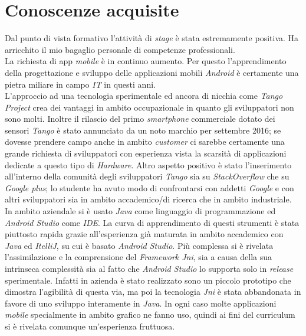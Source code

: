 \section{Conoscenze acquisite}
Dal punto di vista formativo l'attività di \emph{stage} è stata estremamente positiva. Ha arricchito il mio bagaglio personale di competenze professionali.\\

La richiesta di app \emph{mobile} è in continuo aumento. Per questo l'apprendimento della progettazione e sviluppo delle applicazioni mobili \emph{Android} è certamente una pietra miliare in campo \emph{IT} in questi anni.\\

L'approccio ad una tecnologia sperimentale ed ancora di nicchia come \emph{Tango Project} crea dei vantaggi in ambito occupazionale in quanto gli sviluppatori non sono molti. Inoltre il rilascio del primo \emph{smartphone} commerciale dotato dei sensori \emph{Tango} è stato annunciato da un noto marchio per settembre 2016; se dovesse prendere campo anche in ambito \emph{customer} ci sarebbe certamente una grande richiesta di sviluppatori con esperienza vista la scarsità di applicazioni dedicate a questo tipo di \emph{Hardware}. Altro aspetto positivo è stato l'inserimento all'interno della comunità degli sviluppatori \emph{Tango} sia su \emph{StackOverflow} che su \emph{Google plus}; lo studente ha avuto modo di confrontarsi con addetti \emph{Google} e con altri sviluppatori sia in ambito accademico/di ricerca che in ambito industriale.\\

In ambito aziendale si è usato \emph{Java} come linguaggio di programmazione ed \emph{Android Studio} come \emph{IDE}. La curva di apprendimento di questi strumenti è stata piuttosto rapida grazie all'esperienza già maturata in ambito accademico con \emph{Java} ed \emph{ItelliJ}, su cui è basato \emph{Android Studio}. Più complessa si è rivelata l'assimilazione e la comprensione del \emph{Framework Jni}, sia a causa della sua intrinseca complessità sia al fatto che \emph{Android Studio} lo supporta solo in \emph{release} sperimentale. Infatti in azienda è stato realizzato sono un piccolo prototipo che dimostra l'agibilità di questa via, ma poi la tecnologia \emph{Jni} è stata abbandonata in favore di uno sviluppo interamente in \emph{Java}. In ogni caso molte applicazioni \emph{mobile} specialmente in ambito grafico ne fanno uso, quindi ai fini del curriculum si è rivelata comunque un'esperienza fruttuosa.\\

